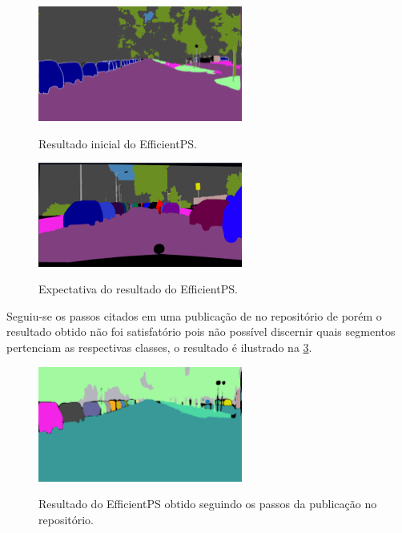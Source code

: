 \begin{figure}[!ht]
	\centering
    \caption{Resultado inicial do EfficientPS.}
	\includegraphics[width=0.6\textwidth]{figures/resultado_primario.png}
	\label{fig:resultado_inicial}
\end{figure}

\begin{figure}[!ht]
	\centering
    \caption{Expectativa do resultado do EfficientPS.}
	\includegraphics[width=0.6\textwidth]{figures/expectativa.png}
	\label{fig:expectativa}
\end{figure}

Seguiu-se os passos citados em uma publicação de  no repositório de  porém o resultado obtido não foi satisfatório pois não possível discernir quais segmentos pertenciam as respectivas classes, o resultado é ilustrado na \cref{fig:resultado_obtido}.

\begin{figure}[!ht]
	\centering
    \caption{Resultado do EfficientPS obtido seguindo os passos da publicação no repositório.}
	\includegraphics[width=0.6\textwidth]{figures/resultado_obtido.png}
	\label{fig:resultado_obtido}
\end{figure}

